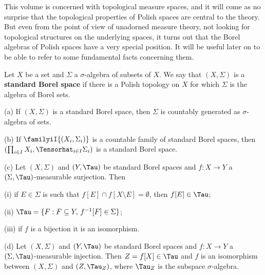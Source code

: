 
\def\NN{\BbbN^{\Bbb N}}

\def\chaptername{Descriptive set theory}
\def\sectionname{Standard Borel spaces}


This volume is concerned with topological measure spaces, and it will
come as no surprise that the topological properties of
Polish spaces are central to the theory.   But even from the
point of view of unadorned measure theory, not looking for
topological structures on the underlying spaces, it turns
out that the Borel algebras of Polish spaces have a very
special position.   It will be useful later on to be able to
refer to some fundamental facts concerning them.

 Let $X$ be a set and $\Sigma$ a
$\sigma$-algebra of subsets of $X$.   We say that $(X,\Sigma)$ is a {\bf
standard Borel space} if there is a Polish topology on $X$ for which
$\Sigma$ is the algebra of Borel sets.


 (a) If $(X,\Sigma)$ is a standard Borel
space, then $\Sigma$ is countably generated as $\sigma$-algebra of sets.

(b) If $\familyiI{(X_i,\Sigma_i)}$ is a countable family of standard
Borel spaces, then
$(\prod_{i\in I}X_i,\Tensorhat_{i\in I}\Sigma_i)$ is a standard Borel space.

(c) Let $(X,\Sigma)$ and $(Y,\Tau)$ be standard Borel spaces and
$f:X\to Y$ a $(\Sigma,\Tau)$-measurable surjection.   Then

\quad(i) if $E\in\Sigma$ is such that
$f[E]\cap f[X\setminus E]=\emptyset$, then $f[E]\in\Tau$;

\quad(ii) $\Tau=\{F:F\subseteq Y,\,f^{-1}[F]\in\Sigma\}$;

\quad(iii) if $f$ is a bijection it is an isomorphism.

(d) Let $(X,\Sigma)$ and $(Y,\Tau)$ be standard Borel spaces and
$f:X\to Y$ a $(\Sigma,\Tau)$-measurable injection.   Then
$Z=f[X]\in\Tau$ and
$f$ is an isomorphism between $(X,\Sigma)$ and $(Z,\Tau_Z)$, where
$\Tau_Z$ is the subspace $\sigma$-algebra.

